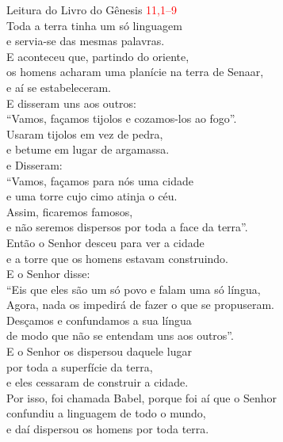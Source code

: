 \documentclass{book}
\begin{document}
\begin{flushleft}

    \vspace{.2cm}
    Leitura do Livro do Gênesis
    \hspace{\fill}
    \textcolor{red}{11,1--9}
    \vspace{.2cm} \\
    Toda a terra tinha um só linguagem \\
    e servia-se das mesmas palavras. \\
    E aconteceu que, partindo do oriente, \\
    os homens acharam uma planície na terra de Senaar, \\
    e aí se estabeleceram. \\
    E disseram uns aos outros: \\
    ``Vamos, façamos tijolos e cozamos-los ao fogo''. \\
    Usaram tijolos em vez de pedra, \\
    e betume em lugar de argamassa. \\
    e Disseram: \\
    ``Vamos, façamos para nós uma cidade \\
    e uma torre cujo cimo atinja o céu. \\
    Assim, ficaremos famosos, \\
    e não seremos dispersos por toda a face da terra''. \\
    Então o Senhor desceu para ver a cidade \\
    e a torre que os homens estavam construindo. \\
    E o Senhor disse: \\
    ``Eis que eles são um só povo e falam uma só língua, \\
    Agora, nada os impedirá de fazer o que se propuseram. \\
    Desçamos e confundamos a sua língua \\
    de modo que não se entendam uns aos outros''. \\
    E o Senhor os dispersou daquele lugar \\
    por toda a superfície da terra, \\
    e eles cessaram de construir a cidade. \\
    Por isso, foi chamada Babel, porque foi aí que o Senhor \\
    confundiu a linguagem de todo o mundo, \\
    e daí dispersou os homens por toda terra.

\end{flushleft}
\end{document}
